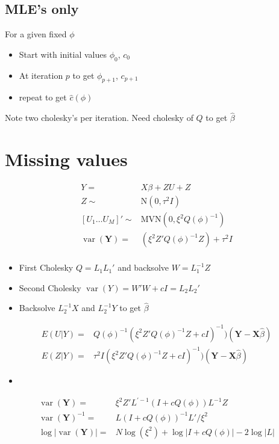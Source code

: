 \documentclass[12pt]{article}
\DeclareMathOperator{\var}{var}
\begin{document}
\subsection*{MLE's only}
For a given fixed $\phi$
\begin{itemize}
  \item Start with initial values  $\phi_0$, $c_0$
  \item At iteration $p$  to get $\phi_{p+1}$, $c_{p+1}$ 
  \item repeat to get $\hat c(\phi)$
\end{itemize}
Note two cholesky's per iteration. Need cholesky of $Q$ to get $\hat\beta$

\section*{Missing values}

\begin{align*}
Y = & X \beta + Z U + Z\\
Z \sim & \text{N}(0, \tau^2I )\\
[U_1 \ldots U_M]' \sim  & \text{MVN}(0, \xi^2 Q(\phi)^{-1})\\
\var(\mathbf{Y})  = &  ( \xi^2 Z' Q(\phi)^{-1}Z)  + \tau^2 I    \\
\end{align*}

\begin{itemize}
\item First Cholesky  $Q = L_1 L_1'$ and backsolve $W = L_1^{-1}Z$
\item Second Cholesky $\var(Y) = W'W + c I = L_2 L_2'$
\item Backsolve $L_2^{-1}X$ and  $L_2^{-1}Y$ to get $\hat\beta$
\end{itemize}

\begin{align*}
E(U|Y) = &  Q(\phi)^{-1}   
(\xi^2 Z' Q(\phi)^{-1}Z + c I)^{-1})
(\mathbf{Y} - \mathbf{X}\hat\beta)\\
E(Z|Y) = & \tau^2 I(\xi^2 Z' Q(\phi)^{-1}Z + c I)^{-1})
(\mathbf{Y} - \mathbf{X}\hat\beta)
\end{align*}

\begin{itemize}
  \item 
\end{itemize}
\begin{align*}
\var(\mathbf{Y}) = &  \xi^2  Z ' L^{\prime -1}(  I + c  Q(\phi)  ) L^{-1} Z\\
\var(\mathbf{Y})^{-1} = &    L(  I + c  Q(\phi)  )^{-1} L' / \xi^2\\
\log |\var(\mathbf{Y})| = & N \log(\xi^2) + \log |I + c Q(\phi)| - 
2 \log |L|\\ 
\end{align*}
\end{document}
